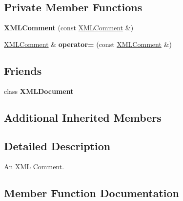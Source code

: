 \subsection*{Private Member Functions}
\begin{DoxyCompactItemize}
\item 
{\bfseries X\+M\+L\+Comment} (const \hyperlink{classtinyxml2_1_1XMLComment}{X\+M\+L\+Comment} \&)\hypertarget{classtinyxml2_1_1XMLComment_aa0a9aae0850ac0e70d3cd20f6cb44447}{}\label{classtinyxml2_1_1XMLComment_aa0a9aae0850ac0e70d3cd20f6cb44447}

\item 
\hyperlink{classtinyxml2_1_1XMLComment}{X\+M\+L\+Comment} \& {\bfseries operator=} (const \hyperlink{classtinyxml2_1_1XMLComment}{X\+M\+L\+Comment} \&)\hypertarget{classtinyxml2_1_1XMLComment_ac8de55f8381d110740772e6bf6f5755a}{}\label{classtinyxml2_1_1XMLComment_ac8de55f8381d110740772e6bf6f5755a}

\end{DoxyCompactItemize}
\subsection*{Friends}
\begin{DoxyCompactItemize}
\item 
class {\bfseries X\+M\+L\+Document}\hypertarget{classtinyxml2_1_1XMLComment_a4eee3bda60c60a30e4e8cd4ea91c4c6e}{}\label{classtinyxml2_1_1XMLComment_a4eee3bda60c60a30e4e8cd4ea91c4c6e}

\end{DoxyCompactItemize}
\subsection*{Additional Inherited Members}


\subsection{Detailed Description}
An X\+ML Comment. 

\subsection{Member Function Documentation}
